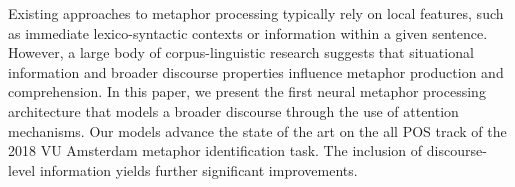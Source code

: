 Existing approaches to metaphor processing typically rely on local features, such as immediate lexico-syntactic contexts or information within a given sentence. However, a large body of corpus-linguistic research suggests that situational information and broader discourse properties influence metaphor production and comprehension. In this paper, we present the first neural metaphor processing architecture that models a broader discourse through the use of attention mechanisms. Our models advance the state of the art on the all POS track of the 2018 VU Amsterdam metaphor identification task. The inclusion of discourse-level information yields further significant improvements.
